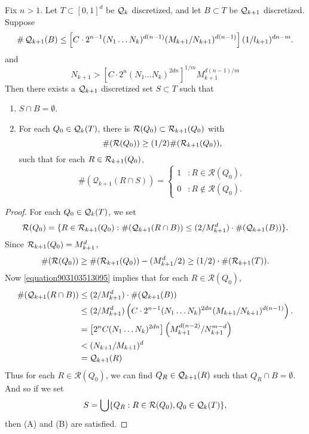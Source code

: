 \begin{lemma} \label{Lemma1209410535}
    Fix $n > 1$. Let $T \subset [0,1]^d$ be $\operatorname{\mathcal{Q}}_k$ discretized, and let $B \subset T$ be $\operatorname{\mathcal{Q}}_{k+1}$ discretized. Suppose
    \[ \# \operatorname{\mathcal{Q}}_{k+1}(B) \leq \left[ C \cdot 2^{n-1} (N_1 \dots N_k)^{d(n-1)} (M_{k+1}/N_{k+1})^{d(n-1)} \right] (1/l_{k+1})^{dn - m}. \]
    and
    \begin{equation} \label{equation903103513095}
        N_{k+1} > \left[ C \cdot 2^n (N_1 \dots N_k)^{2dn} \right]^{1/m} M_{k+1}^{d(n-1)/m}
    \end{equation}
    Then there exists a $\operatorname{\mathcal{Q}}_{k+1}$ discretized set $S \subset T$ such that
    \begin{enumerate}
        \item $S \cap B = \emptyset$.
        \item \label{badsetproperty5} For each $Q_0 \in \operatorname{\mathcal{Q}}_k(T)$, there is $\mathcal{R}(Q_0) \subset \operatorname{\mathcal{R}}_{k+1}(Q_0)$ with
        \[ \#(\mathcal{R}(Q_0)) \geq (1/2) \#(\operatorname{\mathcal{R}}_{k+1}(Q_0)), \]
        such that for each $R \in \operatorname{\mathcal{R}}_{k+1}(Q_0)$,
        \[ \#(\mathcal{Q}_{k+1}(R \cap S)) = \begin{cases} 1 &: R \in \mathcal{R}(Q_0), \\ 0 &: R \not \in \mathcal{R}(Q_0). \end{cases} \]
    \end{enumerate}
\end{lemma}
\begin{proof}
    For each $Q_0 \in \operatorname{\mathcal{Q}}_k(T)$, we set
    \[ \mathcal{R}(Q_0) = \{ R \in \operatorname{\mathcal{R}}_{k+1}(Q_0) : \#(\operatorname{\mathcal{Q}}_{k+1}(R \cap B)) \leq (2/M_{k+1}^d) \cdot \#(\operatorname{\mathcal{Q}}_{k+1}(B)) \}. \]
    Since $\operatorname{\mathcal{R}}_{k+1}(Q_0) = M_{k+1}^d$,
    \[ \#(\mathcal{R}(Q_0)) \geq \#(\operatorname{\mathcal{R}}_{k+1}(Q_0)) - (M_{k+1}^d/2) \geq (1/2) \cdot \#(\operatorname{\mathcal{R}}_{k+1}(T)). \]
    Now \eqref{equation903103513095} implies that for each $R \in \mathcal{R}(Q_0)$,
    \begin{align*}
        \#(\operatorname{\mathcal{Q}}_{k+1}(R \cap B)) &\leq (2/M_{k+1}^d) \cdot \#(\operatorname{\mathcal{Q}}_{k+1}(B))\\
        &\leq (2/M_{k+1}^d) \left(C \cdot 2^{n-1} (N_1 \dots N_k)^{2dn} (M_{k+1}/N_{k+1})^{d(n-1)} \right).\\
        &= \left[ 2^n C (N_1 \dots N_k)^{2dn} \right] \left( M_{k+1}^{d(n-2)} / N_{k+1}^{m-d} \right)\\
        &< (N_{k+1}/M_{k+1})^d\\
        &= \operatorname{\mathcal{Q}}_{k+1}(R)
    \end{align*}
    Thus for each $R \in \mathcal{R}(Q_0)$, we can find $Q_R \in \operatorname{\mathcal{Q}}_{k+1}(R)$ such that $Q_R \cap B = \emptyset$. And so if we set
    \[ S = \bigcup \{ Q_R : R \in \mathcal{R}(Q_0), Q_0 \in \operatorname{\mathcal{Q}}_k(T) \}, \]
    then (A) and (B) are satisfied.
\end{proof}

